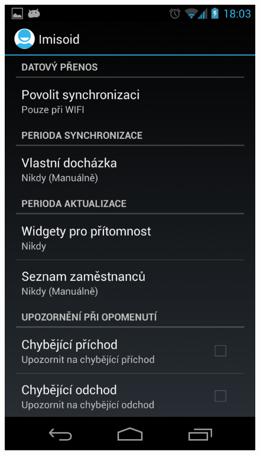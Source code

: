 \documentclass{diplomka}
\begin{document}
\begin{figure}[H]
\centering
\begin{minipage}{.45\textwidth}
  \centering
  \includegraphics[width=.9\linewidth]{scr/settings1.png}
   \caption{}
  \label{fig:}
\end{minipage}\hfill%
\begin{minipage}{.45\textwidth}
   \centering

\end{minipage}
\end{figure}
\end{document}

